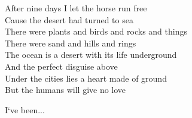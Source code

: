 \ve{}
After nine days I let the horse run free\\
Cause the desert had turned to sea\\
There were plants and birds and rocks and things\\
There were sand and hills and rings\\
The ocean is a desert with its life underground\\
And the perfect disguise above\\
Under the cities lies a heart made of ground\\
But the humans will give no love

\ve{}
I`ve been...

\esong{}

